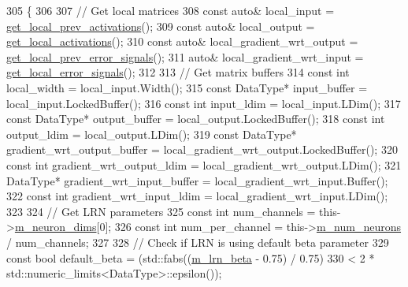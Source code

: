 \begin{DoxyCode}
305                         \{
306 
307     \textcolor{comment}{// Get local matrices}
308     \textcolor{keyword}{const} \textcolor{keyword}{auto}& local\_input = \hyperlink{classlbann_1_1Layer_a35397843bb0c84030000c7d872229acb}{get\_local\_prev\_activations}();
309     \textcolor{keyword}{const} \textcolor{keyword}{auto}& local\_output = \hyperlink{classlbann_1_1Layer_a4248f27acebf72b7b7b3ee39c8bcb62a}{get\_local\_activations}();
310     \textcolor{keyword}{const} \textcolor{keyword}{auto}& local\_gradient\_wrt\_output = \hyperlink{classlbann_1_1Layer_a82827edc5e869960144f3ccb2172bfcd}{get\_local\_prev\_error\_signals}();
311     \textcolor{keyword}{auto}& local\_gradient\_wrt\_input = \hyperlink{classlbann_1_1Layer_af178d00b9d878aa7d87754bff2a91f3a}{get\_local\_error\_signals}();
312 
313     \textcolor{comment}{// Get matrix buffers}
314     \textcolor{keyword}{const} \textcolor{keywordtype}{int} local\_width = local\_input.Width();
315     \textcolor{keyword}{const} DataType* input\_buffer = local\_input.LockedBuffer();
316     \textcolor{keyword}{const} \textcolor{keywordtype}{int} input\_ldim = local\_input.LDim();
317     \textcolor{keyword}{const} DataType* output\_buffer = local\_output.LockedBuffer();
318     \textcolor{keyword}{const} \textcolor{keywordtype}{int} output\_ldim = local\_output.LDim();
319     \textcolor{keyword}{const} DataType* gradient\_wrt\_output\_buffer = local\_gradient\_wrt\_output.LockedBuffer();
320     \textcolor{keyword}{const} \textcolor{keywordtype}{int} gradient\_wrt\_output\_ldim = local\_gradient\_wrt\_output.LDim();
321     DataType* gradient\_wrt\_input\_buffer = local\_gradient\_wrt\_input.Buffer();
322     \textcolor{keyword}{const} \textcolor{keywordtype}{int} gradient\_wrt\_input\_ldim = local\_gradient\_wrt\_input.LDim();
323 
324     \textcolor{comment}{// Get LRN parameters}
325     \textcolor{keyword}{const} \textcolor{keywordtype}{int} num\_channels = this->\hyperlink{classlbann_1_1Layer_abb34bb8031f57a483e2e327a5f229f48}{m\_neuron\_dims}[0];
326     \textcolor{keyword}{const} \textcolor{keywordtype}{int} num\_per\_channel = this->\hyperlink{classlbann_1_1Layer_a6b5ebc8a7d9329d8a773ed787e7b41d8}{m\_num\_neurons} / num\_channels;
327 
328     \textcolor{comment}{// Check if LRN is using default beta parameter}
329     \textcolor{keyword}{const} \textcolor{keywordtype}{bool} default\_beta = (std::fabs((\hyperlink{classlbann_1_1local__response__normalization__layer_ad06848e9d59664be86aecbc1e2ba556f}{m\_lrn\_beta} - 0.75) / 0.75)
330                                < 2 * std::numeric\_limits<DataType>::epsilon());

\end{DoxyCode}
